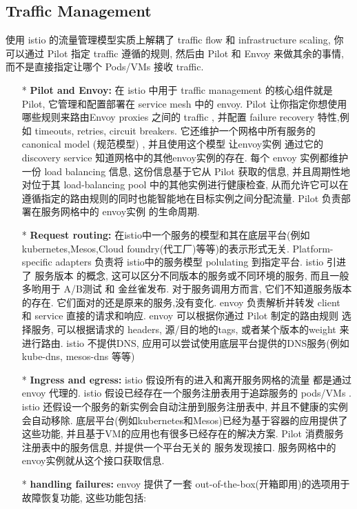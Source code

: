 \documentclass{ctexart}
\begin{document}
\subsection{Traffic Management}
	使用 istio 的流量管理模型实质上解耦了 traffic flow 和 infrastructure scaling,
你可以通过 Pilot 指定 traffic 遵循的规则, 然后由 Pilot 和 Envoy 来做其余的事情,  而不是直接指定让哪个 Pods/VMs 接收 traffic.
\begin{enumerate}
	\item [*] \textbf{Pilot and Envoy:}
在 istio 中用于 traffic management 的核心组件就是 Pilot, 它管理和配置部署在 service mesh 中的 envoy.
Pilot 让你指定你想使用哪些规则来路由Envoy proxies 之间的 traffic , 并配置 failure recovery 特性,例如 timeouts, retries, circuit breakers.
它还维护一个网格中所有服务的 canonical model (规范模型) , 并且使用这个模型 让envoy实例 通过它的 discovery service 知道网格中的其他envoy实例的存在.
每个 envoy 实例都维护一份 load balancing 信息, 这份信息基于它从 Pilot 获取的信息, 并且周期性地对位于其 load-balancing pool 中的其他实例进行健康检查, 从而允许它可以在遵循指定的路由规则的同时也能智能地在目标实例之间分配流量.
Pilot 负责部署在服务网格中的 envoy实例 的生命周期.

	
	\item [*] \textbf{Request routing:}
	在istio中一个服务的模型和其在底层平台(例如kubernetes,Mesos,Cloud foundry(代工厂)等等)的表示形式无关.
	Platform-specific adapters 负责将 istio中的服务模型 polulating 到指定平台.
	istio 引进了 服务版本 的概念, 这可以区分不同版本的服务或不同环境的服务, 而且一般多哟用于 A/B测试 和 金丝雀发布.
	对于服务调用方而言, 它们不知道服务版本的存在. 它们面对的还是原来的服务,没有变化.  envoy 负责解析并转发 client 和 service 直接的请求和响应.
	envoy 可以根据你通过 Pilot 制定的路由规则 选择服务, 可以根据请求的 headers, 源/目的地的tags, 或者某个版本的weight 来进行路由.
	istio 不提供DNS, 应用可以尝试使用底层平台提供的DNS服务(例如 kube-dns, mesos-dns 等等)
	
	\item [*] \textbf{Ingress and egress:}
	istio 假设所有的进入和离开服务网格的流量 都是通过 envoy 代理的.
	istio 假设已经存在一个服务注册表用于追踪服务的 pods/VMs . istio 还假设一个服务的新实例会自动注册到服务注册表中, 并且不健康的实例会自动移除.  底层平台(例如kubernetes和Mesos)已经为基于容器的应用提供了这些功能, 并且基于VM的应用也有很多已经存在的解决方案.
	Pilot 消费服务注册表中的服务信息, 并提供一个平台无关的 服务发现接口.  服务网格中的envoy实例就从这个接口获取信息.
	
	\item [*] \textbf{handling failures:}
	envoy 提供了一套 out-of-the-box(开箱即用)的选项用于故障恢复功能,  这些功能包括:
	

\end{enumerate}
\end{document}
